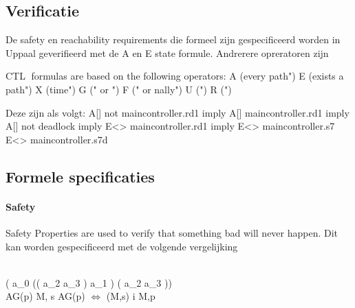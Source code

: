 \subsection{Verificatie}
     De safety en reachability requirements die formeel zijn gespecificeerd worden in Uppaal geverifieerd met de A en E state formule. Andrerere opreratoren zijn



CTL formulas are based on the following operators:
A (\on every path")
E (\there exists a path")
X (\next time")
G (\globally" or \always")
F (\eventually" or \nally")
U (\until")
R (\release")



Deze zijn als volgt:
\newline
\newline
A[] not maincontroller.rd1 imply
\newline
\newline
A[] maincontroller.rd1 imply
\newline
\newline
A[] not deadlock imply
\newline
\newline
E<> maincontroller.rd1 imply
\newline
\newline
E<> maincontroller.s7
\newline
\newline
E<> maincontroller.s7d
\newline
\newline

\subsection{Formele specificaties}

\paragraph{Safety}
Safety Properties are used to verify that something
bad will never happen. Dit kan worden gespecificeerd met de volgende vergelijking

\aqcap\\

\square ( a_0 \implies (( \lnot a_2 \wedge \lnot a_3 )  a_1 ) \vee ( \lnot a_2 \wedge \lnot a_3 )) \\

AG(p)
M, s \models AG(p) $\Leftrightarrow$     \forall \pi \in  \sqcap (M,s) \cdot \forall i \cdot M,\pi[i] \models p\\

